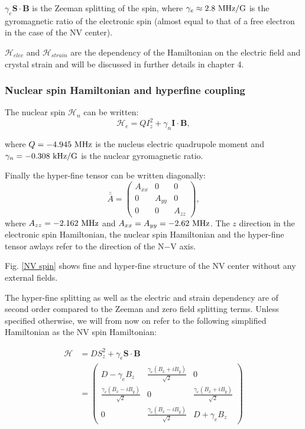 \documentclass[a4paper, 11pt]{report}
\begin{document}
$\gamma_e \mathbf{S} \cdot \mathbf{B}$ is the Zeeman splitting of the spin, where $\gamma_e \approx 2.8\ \rm MHz/G$ is the gyromagnetic ratio of the electronic spin (almost equal to that of a free electron in the case of the NV center).

$\mathcal{H}_{elec}$ and $\mathcal{H}_{strain}$ are the dependency of the Hamiltonian on the electric field and crystal strain and will be discussed in further details in chapter 4.

\subsubsection{Nuclear spin Hamiltonian and hyperfine coupling}
The nuclear spin $\mathcal{H}_n$ can be written:
\begin{equation}
\mathcal{H}_e=Q I_z^2 + \gamma_n \mathbf{I} \cdot \mathbf{B},
\end{equation}

where $Q=-4.945\ \rm MHz$ is the nucleus electric quadrupole moment and $\gamma_n=-0.308\ \rm kHz/G$ is the nuclear gyromagnetic ratio.

Finally the hyper-fine tensor can be written diagonally:
\begin{equation}
\bar{\bar{A}} = \begin{pmatrix}
A_{xx} & 0 & 0 \\
0 & A_{yy} & 0 \\
0 & 0 & A_{zz}
\end{pmatrix},
\end{equation}
where $A_{zz}=-2.162\ \rm MHz$ and $A_{xx}=A_{yy}=-2.62\ \rm MHz$. The $z$ direction in the electronic spin Hamiltonian, the nuclear spin Hamiltonian and the hyper-fine tensor awlays refer to the direction of the N$-$V axis.

Fig. \ref{NV spin} shows fine and hyper-fine structure of the NV center without any external fields.

The hyper-fine splitting as well as the electric and strain dependency are of second order compared to the Zeeman and zero field splitting terms. Unless specified otherwise, we will from now on refer to the following simplified Hamiltonian as the NV spin Hamiltonian:

\begin{align}
\label{NV spin Hamiltonian basic}
\mathcal{H}&=D S_z^2 + \gamma_e \mathbf{S} \cdot \mathbf{B} \\
&=\begin{pmatrix}
D-\gamma_e B_z & \frac{\gamma_e (B_x+iB_y)}{\sqrt{2}} & 0 \\
\frac{\gamma_e (B_x-iB_y)}{\sqrt{2}} & 0 & \frac{\gamma_e (B_x+iB_y)}{\sqrt{2}} \\
0 & \frac{\gamma_e (B_x-iB_y)}{\sqrt{2}} & D+\gamma_e B_z
\end{pmatrix}
\end{align}
\end{document}
